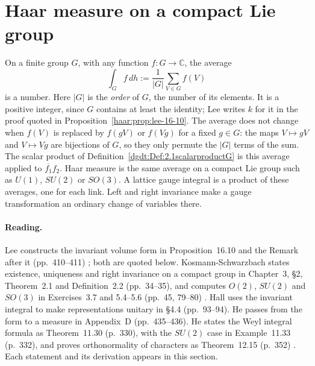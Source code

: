 \section{Haar measure on a compact Lie group}\label{haar:sec:haar}
On a finite group $G$, with any function $f\colon G\to\mathbb C$, the average
\begin{equation}\label{haar:finite-average}
 \int_G f\,dh:=\frac1{|G|}\sum_{V\in G}f(V)
\end{equation}
is a number. Here $|G|$ is the \emph{order} of $G$, the number of its
elements. It is a positive integer, since $G$ contains at least the
identity; Lee writes $k$ for it in the proof quoted in
Proposition~\ref{haar:prop:lee-16-10}. The average does not change when
$f(V)$ is replaced by $f(gV)$ or $f(Vg)$ for a fixed $g\in G$: the maps
$V\mapsto gV$ and $V\mapsto Vg$ are bijections of $G$, so they only permute
the $|G|$ terms of the sum. The scalar product of
Definition~\ref{dgdt:Def:2.1scalarproductG} is this average applied to
$\overline{f_1}f_2$. Haar measure is the same average on a compact Lie group
such as $U(1)$, $SU(2)$ or $SO(3)$. A lattice gauge integral is a product of
these averages, one for each link. Left and right invariance make a gauge
transformation an ordinary change of variables there.

\paragraph{Reading.} Lee constructs the invariant volume form in
Proposition~16.10 and the Remark after it (pp.~410--411)
\cite{dgdt:JLee2012}; both are quoted below. Kosmann-Schwarzbach states
existence, uniqueness and right invariance on a compact group in Chapter~3,
\S2, Theorem~2.1 and Definition~2.2 (pp.~34--35), and computes $O(2)$,
$SU(2)$ and $SO(3)$ in Exercises~3.7 and 5.4--5.6 (pp.~45, 79--80)
\cite{dgdt:YKosmann-Schwarzbach2010}. Hall uses the invariant integral to
make representations unitary in \S4.4 (pp.~93--94). He passes from the form
to a measure in Appendix~D (pp.~435--436). He states the Weyl integral formula
as Theorem~11.30 (p.~330), with the $SU(2)$ case in Example~11.33 (p.~332),
and proves orthonormality of characters as Theorem~12.15 (p.~352)
\cite{BCHall2015}. Each statement and its derivation appears in this section.

